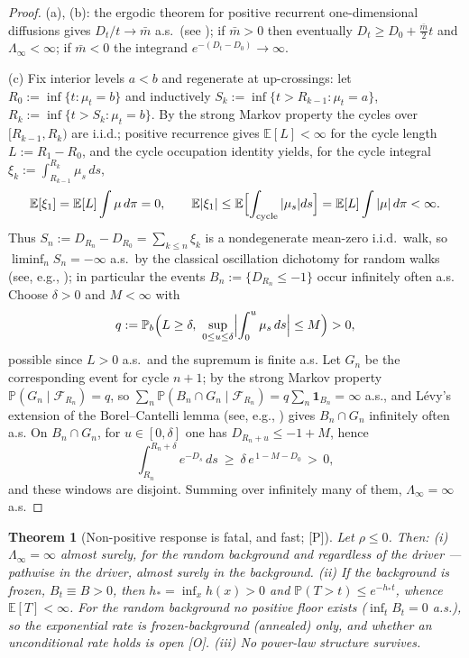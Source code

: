 \documentclass[11pt]{article}
\newtheorem{theorem}{Theorem}[section]
\theoremstyle{definition}
\theoremstyle{remark}
\newcommand{\PP}{\mathbb{P}}
\newcommand{\E}{\mathbb{E}}
\newcommand{\one}{\mathbf{1}}
\newcommand{\Fc}{\mathcal{F}}
\begin{document}
\begin{proof}
(a), (b): the ergodic theorem for positive recurrent one-dimensional
diffusions gives $D_t/t\to\bar m$ a.s.\ (see \cite[Ch.~X]{RY99}); if
$\bar m>0$ then eventually $D_t\ge D_0+\tfrac{\bar m}2t$ and
$\Lambda_\infty<\infty$; if $\bar m<0$ the integrand
$e^{-(D_t-D_0)}\to\infty$.

(c) Fix interior levels $a<b$ and regenerate at up-crossings: let
$R_0:=\inf\{t:\mu_t=b\}$ and inductively
$S_k:=\inf\{t>R_{k-1}:\mu_t=a\}$, $R_k:=\inf\{t>S_k:\mu_t=b\}$. By the
strong Markov property the cycles over $[R_{k-1},R_k)$ are i.i.d.; positive
recurrence gives $\E[L]<\infty$ for the cycle length
$L:=R_1-R_0$, and the cycle occupation identity yields, for the cycle
integral $\xi_k:=\int_{R_{k-1}}^{R_k}\mu_s\,ds$,
\[
\E[\xi_1]=\E[L]\int\mu\,d\pi=0,\qquad
\E|\xi_1|\le\E\Bigl[\int_{\text{cycle}}|\mu_s|ds\Bigr]
=\E[L]\int|\mu|\,d\pi<\infty .
\]
Thus $S_n:=D_{R_n}-D_{R_0}=\sum_{k\le n}\xi_k$ is a nondegenerate mean-zero
i.i.d.\ walk, so $\liminf_nS_n=-\infty$ a.s.\ by the classical
oscillation dichotomy for random walks (see, e.g., \cite{Dur19});
in particular the events $B_n:=\{D_{R_n}\le-1\}$ occur infinitely often
a.s. Choose $\delta>0$ and $M<\infty$ with
\[
q:=\PP_b\Bigl(L\ge\delta,\ \sup_{0\le u\le\delta}
\Bigl|\int_0^u\mu_s\,ds\Bigr|\le M\Bigr)>0,
\]
possible since $L>0$ a.s.\ and the supremum is finite a.s. Let
$G_n$ be the corresponding event for cycle $n{+}1$; by the strong Markov
property $\PP(G_n\mid\Fc_{R_n})=q$, so
$\sum_n\PP(B_n\cap G_n\mid\Fc_{R_n})=q\sum_n\one_{B_n}=\infty$ a.s., and
L\'evy's extension of the Borel--Cantelli lemma (see, e.g.,
\cite{Dur19}) gives
$B_n\cap G_n$ infinitely often a.s. On $B_n\cap G_n$, for
$u\in[0,\delta]$ one has $D_{R_n+u}\le-1+M$, hence
\[
\int_{R_n}^{R_n+\delta}e^{-D_s}\,ds\ \ge\ \delta\,e^{\,1-M-D_0}\,>\,0 ,
\]
and these windows are disjoint. Summing over infinitely many of them,
$\Lambda_\infty=\infty$ a.s.
\end{proof}

\begin{theorem}[Non-positive response is fatal, and fast; {[P]}]
\label{thm:trapped}
Let $\rho\le0$. Then: (i) $\Lambda_\infty=\infty$ almost surely, for
the random background and regardless of the driver --- pathwise in the
driver, almost surely in the background. (ii) If the background is
frozen, $B_t\equiv B>0$, then $h_\ast=\inf_xh(x)>0$ and
$\PP(T>t)\le e^{-h_\ast t}$, whence $\E[T]<\infty$. For the random
background no positive floor exists ($\inf_tB_t=0$ a.s.), so the
exponential rate is frozen-background (annealed) only, and whether an
unconditional rate holds is open [O]. (iii) No power-law structure
survives.
\end{theorem}
\end{document}
